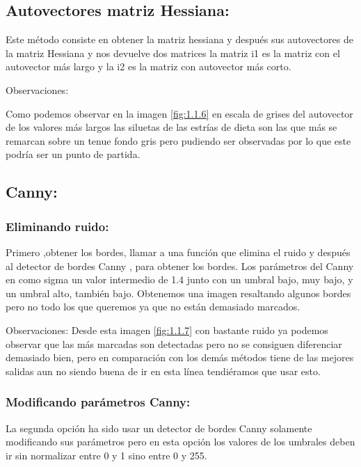 \subsection{Autovectores matriz Hessiana:}
Este método consiste en obtener la matriz hessiana \cite{wiki:Hessiana} y después sus autovectores de la matriz Hessiana y nos devuelve dos matrices la matriz i1 es la matriz con el autovector más largo y la i2 es la matriz con autovector más corto.



Observaciones: 

Como podemos observar en la imagen \ref{fig:1.1.6} en escala de grises del autovector de los valores más largos las siluetas de las estrías de dieta son las que más se remarcan sobre un tenue fondo gris pero pudiendo ser observadas por lo que este podría ser un punto de partida.



\subsection{Canny:}

\subsubsection{Eliminando ruido:}
Primero ,obtener los bordes, llamar a una función que elimina el ruido y después al detector de bordes Canny \cite{wiki:Canny}, para obtener los bordes.
Los parámetros del Canny en como sigma un valor intermedio de 1.4 junto con un umbral bajo, muy bajo, y un umbral alto, también bajo.
Obtenemos una imagen resaltando algunos bordes pero no todo los que queremos ya que no están demasiado marcados.




Observaciones:
Desde esta imagen \ref{fig:1.1.7} con bastante ruido ya podemos observar que las más marcadas son detectadas pero no se consiguen diferenciar demasiado bien, pero en comparación con los demás métodos tiene de las mejores salidas aun no siendo buena de ir en esta línea tendiéramos que usar esto.

\subsubsection{Modificando parámetros Canny:}

La segunda opción ha sido usar un detector de bordes Canny solamente modificando sus parámetros pero en esta opción los valores de los umbrales deben ir sin normalizar entre 0 y 1 sino entre 0 y 255.


